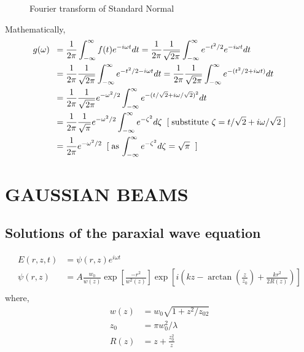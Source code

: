 \documentclass[11pt,a4paper]{article}
\begin{document}



\begin{figure}[ht]
	\centering
	\scalebox{1}{}
	\caption{Fourier transform of Standard Normal}
	\label{fig:fft_gaussian}
\end{figure}
Mathematically,\\
\begin{align*}
	g(\omega)\;\;&=\frac{1}{2\pi}\int_{-\infty}^{\infty}f(t)e^{-i\omega t} dt = \frac{1}{2\pi}\frac{1}{\sqrt{2\pi}}\int_{-\infty}^{\infty}e^{-t^2 /2}e^{-i\omega t} dt\\
	&= \frac{1}{2\pi}\frac{1}{\sqrt{2\pi}}\int_{-\infty}^{\infty}e^{-t^2/2-i\omega t} dt
	= \frac{1}{2\pi}\frac{1}{\sqrt{2\pi}}\int_{-\infty}^{\infty}e^{-(t^2/2+i\omega t)} dt\\
	&= \frac{1}{2\pi}\frac{1}{\sqrt{2\pi}}e^{-\omega^2/2} \int_{-\infty}^{\infty}e^{-(t/\sqrt{2}+i\omega/\sqrt{2})^2} dt\\
	&= \frac{1}{2\pi}\frac{1}{\sqrt{\pi}}e^{-\omega^2/2} \int_{-\infty}^{\infty}e^{-\zeta^2} d\zeta \;\;\text{[\;substitute $\zeta=t/\sqrt{2}+i\omega/\sqrt{2}$\;]}\\
	&=\frac{1}{2\pi}e^{-\omega^2/2} \;\;\text{[\;as $\int_{-\infty}^{\infty}e^{-\zeta^2} d\zeta=\sqrt{\pi}$ \;]}
\end{align*}

\clearpage

\section{GAUSSIAN BEAMS}
\subsection{Solutions of the paraxial wave equation}
\vspace{-0.5cm}
\begin{align*}
	E(r,z,t)&=\psi(r,z)e^{i\omega t}\\
	\psi(r,z)&=A\frac{w_0}{w(z)}\exp{\left[\frac{-r^2}{w^2(z)}\right]} \exp{\left[i\left(kz-\arctan(\frac{z}{z_0})+\frac{kr^2}{2R(z)}\right)\right]}\\
\end{align*}
where,
\begin{align*}
	w(z)&= w_0\sqrt{1+z^2/z_02}\\
	z_0&=\pi w_0^2/\lambda\\
	R(z)&=z+\frac{z_0^2}{z}
\end{align*}
\end{document}

